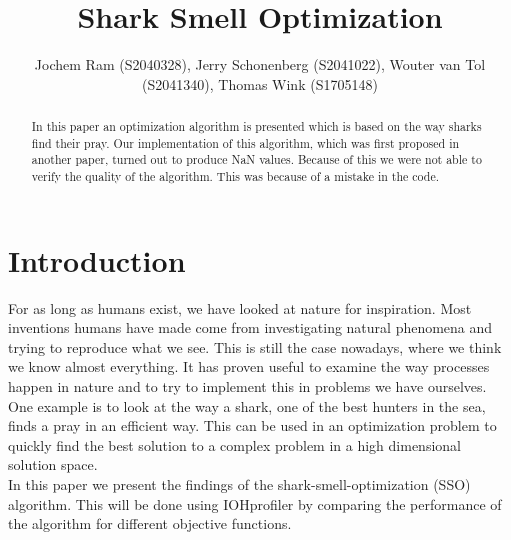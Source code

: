 \documentclass[runningheads]{llncs}
\begin{document}
%
\title{Shark Smell Optimization}
%
%
\author{Jochem Ram (S2040328), Jerry Schonenberg (S2041022), Wouter van Tol (S2041340), Thomas Wink (S1705148)}
%
%
%
\maketitle              %
%
\begin{abstract}
In this paper an optimization algorithm is presented which is based on the way sharks find their pray. Our implementation of this algorithm, which was first proposed in another paper\cite{abedinia2014shark}, turned out to produce NaN values. Because of this we were not able to verify the quality of the algorithm. This was because of a mistake in the code.
\end{abstract}





\section{Introduction}
For as long as humans exist, we have looked at nature for inspiration. Most inventions humans have made come from investigating natural phenomena and trying to reproduce what we see. This is still the case nowadays, where we think we know almost everything. It has proven useful to examine the way processes happen in nature and to try to implement this in problems we have ourselves. One example is to look at the way a shark, one of the best hunters in the sea, finds a pray in an efficient way. This can be used in an optimization problem to quickly find the best solution to a complex problem in a high dimensional solution space.\\
In this paper we present the findings of the shark-smell-optimization (SSO)\cite{abedinia2014shark} algorithm. This will be done using IOHprofiler by comparing the performance of the algorithm for different objective functions.
\end{document}
